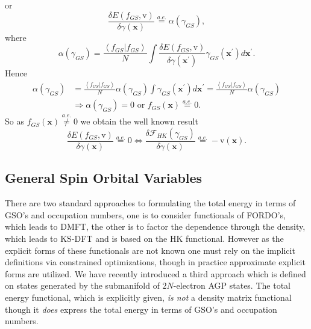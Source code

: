 \documentclass[aps,preprint]{revtex4}%
\begin{document}
or
\begin{equation}
\frac{\delta E\left(  f_{GS}\boldsymbol{,}\mathrm{v}\right)  }{\delta
\gamma\left(  \boldsymbol{x}\right)  }\overset{a.e.}{=}\alpha\left(
\gamma_{GS}\right)  , \label{fmin}%
\end{equation}
where%
\begin{equation}
\alpha\left(  \gamma_{GS}\right)  =\frac{\left\langle f_{GS}|f_{GS}%
\right\rangle }{N}\int\frac{\delta E\left(  f_{GS}\boldsymbol{,}%
\mathrm{v}\right)  }{\delta\gamma\left(  \boldsymbol{x}^{\prime}\right)
}\gamma_{GS}\left(  \boldsymbol{x}^{\prime}\right)  d\boldsymbol{x}^{\prime}.
\label{alpha}%
\end{equation}
Hence
\begin{align}
\alpha\left(  \gamma_{GS}\right)   &  =\frac{\left\langle f_{GS}%
|f_{GS}\right\rangle }{N}\alpha\left(  \gamma_{GS}\right)  \int\gamma
_{GS}\left(  \boldsymbol{x}^{\prime}\right)  d\boldsymbol{x}^{\prime}%
=\frac{\left\langle f_{GS}|f_{GS}\right\rangle }{N}\alpha\left(  \gamma
_{GS}\right) \\
&  \Rightarrow\alpha\left(  \gamma_{GS}\right)  =0\text{ or }f_{GS}\left(
\boldsymbol{x}\right)  \overset{a.e.}{=}0.
\end{align}
So as $f_{GS}\left(  \boldsymbol{x}\right)  \overset{a.e.}{\neq}0$ we obtain
the well known result
\begin{equation}
\frac{\delta E\left(  f_{GS}\boldsymbol{,}\mathrm{v}\right)  }{\delta
\gamma\left(  \boldsymbol{x}\right)  }\overset{a.e.}{=}0\Leftrightarrow
\frac{\delta\mathcal{F}_{HK}\left(  \gamma_{GS}\right)  }{\delta\gamma\left(
\boldsymbol{x}\right)  }\overset{a.e.}{=}-\mathrm{v}\left(  \boldsymbol{x}%
\right)  .
\end{equation}


\subsection{General Spin Orbital Variables \label{GSO}}

There are two standard approaches to formulating the total energy in terms of
GSO's and occupation numbers, one is to consider functionals of FORDO's, which
leads to DMFT, the other is to factor the dependence through the density,
which leads to KS-DFT and is based on the HK functional. However as the
explicit forms of these functionals are not known one must rely on the
implicit definitions via constrained optimizations, though in practice
approximate explicit forms are utilized. We have recently \cite{WeinerOrtiz05}
introduced a third approach which is defined on states generated by the
submanifold of $2N$-electron AGP states. The total energy functional, which is
explicitly given, \emph{is not} a density matrix functional though it
\emph{does} express the total energy in terms of GSO's and occupation numbers.
\end{document}

